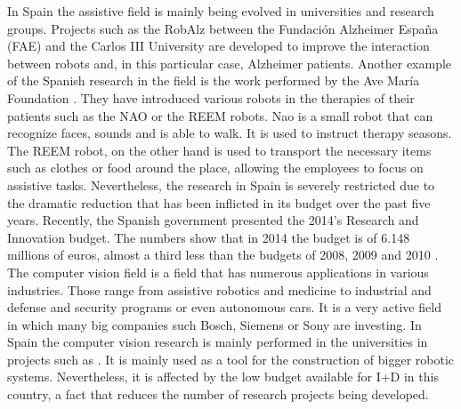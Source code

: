 In Spain the assistive field is mainly being evolved in universities and research groups. 
Projects such as the RobAlz between the Fundación Alzheimer España (FAE) and the Carlos III University \cite{robalz} are developed to improve the interaction between robots and, in this particular case, Alzheimer patients.  
Another example of the Spanish research in the field is the work performed by the Ave María Foundation \cite{assistive_spain}.
They have introduced various robots in the therapies of their patients such as the NAO or the REEM robots. 
Nao is a small robot that can recognize faces, sounds and is able to walk. 
It is used to instruct therapy seasons. 
The REEM robot, on the other hand is used to transport the necessary items such as clothes or food around the place, allowing the employees to focus on assistive tasks. 
Nevertheless, the research in Spain is severely restricted due to the dramatic reduction that has been inflicted in its budget over the past five years. 
Recently, the Spanish government presented the 2014's Research and Innovation budget.
The numbers show that in 2014 the budget is of 6.148 millions of euros, almost a third less than the budgets of 2008, 2009 and 2010 \cite{budget_i_mas_d}.
\\

The computer vision field is a field that has numerous applications in various industries. 
Those range from assistive robotics and medicine to industrial and defense and security programs or even autonomous cars.
It is a very active field in which many big companies such Bosch, Siemens or Sony are investing. 
In Spain the computer vision research is mainly performed in the universities in projects such as \cite{robalz}. 
It is mainly used as a tool for the construction of bigger robotic systems. 
Nevertheless, it is affected by the low budget available for I+D in this country, a fact that reduces the number of research projects being developed. 




